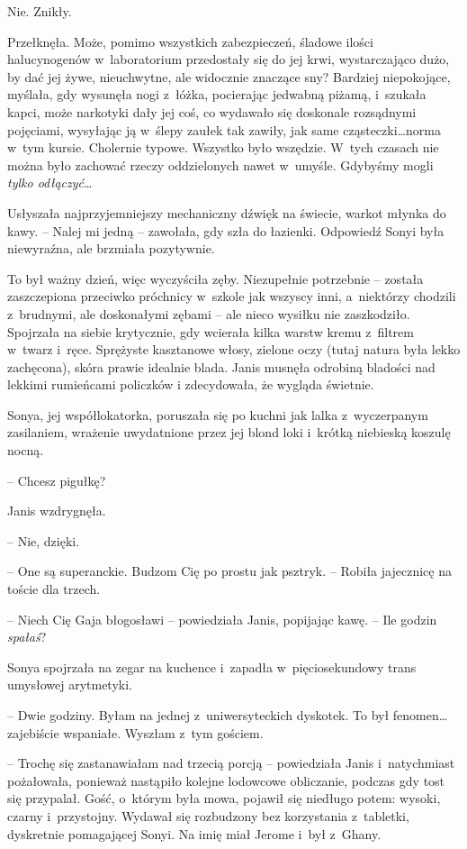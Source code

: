 \documentclass[oneside,polish,11pt,sfheadings]{mwbk}
\begin{document}
Nie. Znikły.

Przełknęła. Może, pomimo wszystkich zabezpieczeń, śladowe ilości
halucynogenów w~laboratorium przedostały się do jej krwi, wystarczająco
dużo, by dać jej żywe, nieuchwytne, ale widocznie znaczące sny? Bardziej
niepokojące, myślała, gdy wysunęła nogi z~łóżka, pocierając jedwabną
piżamą, i~szukała kapci, może narkotyki dały jej coś, co wydawało się
doskonale rozsądnymi pojęciami, wysyłając ją w~ślepy zaułek tak zawiły,
jak same cząsteczki\ldots norma w~tym kursie. Cholernie typowe. Wszystko
było wszędzie. W~tych czasach nie można było zachować rzeczy
oddzielonych nawet w~umyśle. Gdybyśmy mogli \emph{tylko odłączyć}\ldots

Usłyszała najprzyjemniejszy mechaniczny dźwięk na świecie, warkot młynka
do kawy. -- Nalej mi jedną -- zawołała, gdy szła do łazienki. Odpowiedź
Sonyi była niewyraźna, ale brzmiała pozytywnie.

To był ważny dzień, więc wyczyściła zęby. Niezupełnie potrzebnie -- została zaszczepiona przeciwko próchnicy w~szkole jak wszyscy inni, a~niektórzy chodzili z~brudnymi, ale doskonałymi zębami -- ale nieco
wysiłku nie zaszkodziło. Spojrzała na siebie krytycznie, gdy wcierała
kilka warstw kremu z~filtrem w~twarz i~ręce. Sprężyste kasztanowe włosy,
zielone oczy (tutaj natura była lekko zachęcona), skóra prawie idealnie
blada. Janis musnęła odrobiną bladości nad lekkimi rumieńcami policzków
i zdecydowała, że wygląda świetnie.

Sonya, jej współlokatorka, poruszała się po kuchni jak lalka z~wyczerpanym zasilaniem, wrażenie uwydatnione przez jej blond loki i~krótką niebieską koszulę nocną.

-- Chcesz pigułkę?

Janis wzdrygnęła. 

-- Nie, dzięki.

-- One są superanckie. Budzom Cię po prostu jak psztryk. -- Robiła
jajecznicę na toście dla trzech.

-- Niech Cię Gaja błogosławi -- powiedziała Janis, popijając kawę. -- Ile
godzin \emph{spałaś}?

Sonya spojrzała na zegar na kuchence i~zapadła w~pięciosekundowy trans
umysłowej arytmetyki.

-- Dwie godziny. Byłam na jednej z~uniwersyteckich dyskotek. To był
fenomen\ldots zajebiście wspaniałe. Wyszłam z~tym gościem.

-- Trochę się zastanawiałam nad trzecią porcją -- powiedziała Janis i~natychmiast pożałowała, ponieważ nastąpiło kolejne lodowcowe obliczanie,
podczas gdy tost się przypalał. Gość, o~którym była mowa, pojawił się
niedługo potem: wysoki, czarny i~przystojny. Wydawał się rozbudzony bez
korzystania z~tabletki, dyskretnie pomagającej Sonyi. Na imię miał
Jerome i~był z~Ghany.
\end{document}
